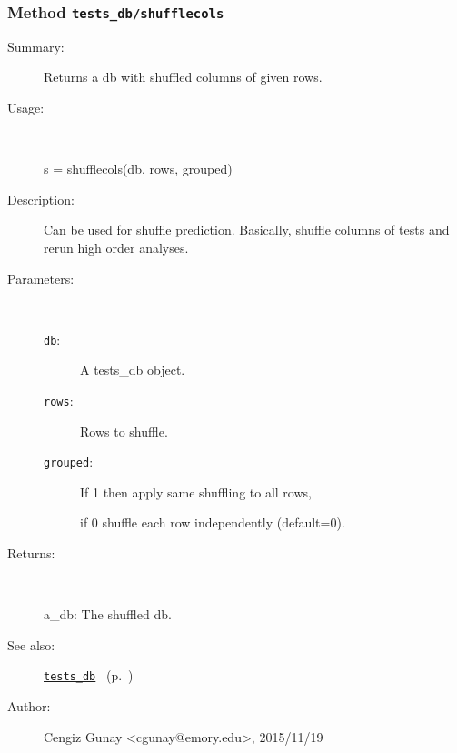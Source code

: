 \subsubsection[Method \texttt{shufflecols}]{Method \texttt{tests\_db/shufflecols}}%
%
\label{ref_tests_db__shufflecols}%
\hypertarget{ref_tests_db__shufflecols}{}%
\begin{description}
\item[Summary:]Returns a db with shuffled columns of given rows. 
%
\item[Usage:]~%
\begin{lyxcode}%
s = shufflecols(db, rows, grouped)
%
\end{lyxcode}%
%
\item[Description:]%
Can be used for shuffle prediction. Basically, shuffle columns of tests and rerun
 high order analyses. 
\item[Parameters:]~
\begin{description}%
\item[\texttt{db}:]
 A tests\_db object.
\item[\texttt{rows}:]
 Rows to shuffle.
\item[\texttt{grouped}:]
 If 1 then apply same shuffling to all rows, 

if 0 shuffle each row independently (default=0).
\end{description}%
%
\item[Returns:
]~

	a\_db: The shuffled db.
%
%
\item[See also:]%
\hyperlink{ref_tests_db}{\texttt{tests\_db}}%
\ (p.~\pageref{ref_tests_db})%
%
%
\item[Author:]%
Cengiz Gunay <cgunay@emory.edu>, 2015/11/19
%
\end{description}
\methodline%
